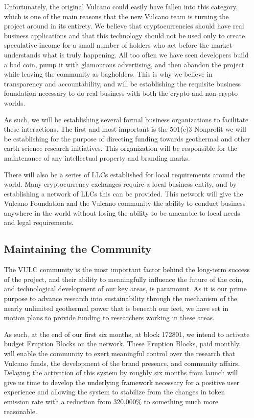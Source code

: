\documentclass[A4paper, 12pt]{article}
\begin{document}
Unfortunately, the original Vulcano could easily have fallen into this category, which is one of the main reasons that the new Vulcano team is turning the project around in its entirety. We believe that cryptocurrencies should have real business applications and that this technology should not be used only to create speculative income for a small number of holders who act before the market understands what is truly happening. All too often we have seen developers build a bad coin, pump it with glamourous advertising, and then abandon the project while leaving the community as bagholders. This is why we believe in transparency and accountability, and will be establishing the requisite business foundation necessary to do real business with both the crypto and non-crypto worlds. 

As such, we will be establishing several formal business organizations to facilitate these interactions. The first and most important is the 501(c)3 Nonprofit we will be establishing for the purpose of directing funding towards geothermal and other earth science research initiatives. This organization will be responsible for the maintenance of any intellectual property and branding marks.

There will also be a series of LLCs established for local requirements around the world. Many cryptocurrency exchanges require a local business entity, and by establishing a network of LLCs this can be provided. This network will give the Vulcano Foundation and the Vulcano community the ability to conduct business anywhere in the world without losing the ability to be amenable to local needs and legal requirements.

\subsection{Maintaining the Community}
The VULC community is the most important factor behind the long-term success of the project, and their ability to meaningfully influence the future of the coin, and technological development of our key areas, is paramount. As it is our prime purpose to advance research into sustainability through the mechanism of the nearly unlimited geothermal power that is beneath our feet, we have set in motion plans to provide funding to researchers working in these areas. 

As such, at the end of our first six months, at block 172801, we intend to activate budget Eruption Blocks on the network. These Eruption Blocks, paid monthly, will enable the community to exert meaningful control over the research that Vulcano funds, the development of the brand presence, and community affairs. Delaying the activation of this system by roughly six months from launch will give us time to develop the underlying framework necessary for a positive user experience and allowing the system to stabilize from the changes in token emission rate with a reduction from 320,000\% to something much more reasonable. 
\end{document}
